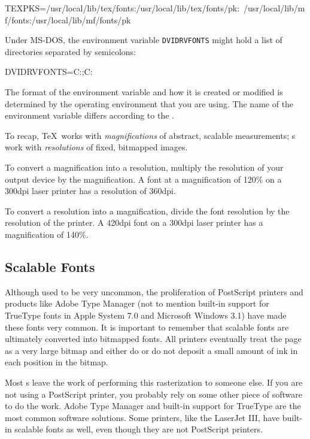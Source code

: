 \begin{shortexample}
TEXPKS=/usr/local/lib/tex/fonts:/usr/local/lib/tex/fonts/pk:\
/usr/local/lib/mf/fonts:/usr/local/lib/mf/fonts/pk
\end{shortexample}

Under MS-DOS, the environment variable \verb|DVIDRVFONTS| might
hold a list of directories separated by semicolons:

\begin{shortexample}
DVIDRVFONTS=C:\TEXFONTS;C:\MYFONTS
\end{shortexample}

The format of the environment variable and how it is created or modified
is determined by the operating environment that you are using.  The name
of the environment variable differs according to the \dvidriver.  

To recap, \TeX\ works 
with {\em magnifications\/} of abstract,
scalable measurements; \dvidriver{}s work with {\em resolutions\/} of
fixed, bitmapped images.

To convert a magnification into a resolution, multiply the resolution of
your output device by the magnification.  A font at a magnification of
120\% on a 300dpi laser printer has a resolution of 360dpi.  

To convert a resolution into a magnification, divide the font resolution by
the resolution of the printer.  A 420dpi font on a 300dpi laser printer
has a magnification of 140\%.

\subsection{Scalable Fonts}

Although  used to 
be very uncommon, the proliferation of 
PostScript
printers and products like Adobe Type Manager (not to mention built-in
support for TrueType fonts in Apple System 7.0 and Microsoft Windows 3.1)
have made these fonts very common.
It is important to remember that scalable fonts are ultimately
converted into bitmapped fonts.  All printers eventually treat the
page as a very large bitmap and either do or do not deposit a small
amount of ink in each position in the bitmap.

Most \dvidriver{}s leave the work of performing this rasterization to 
someone else.  If you are not using a PostScript printer,
you probably rely on some other piece of software to do the
work.  Adobe Type Manager and built-in support for TrueType are the most
common software solutions.
Some printers, like the LaserJet III, have built-in scalable fonts as
well, even though they are not PostScript printers.

